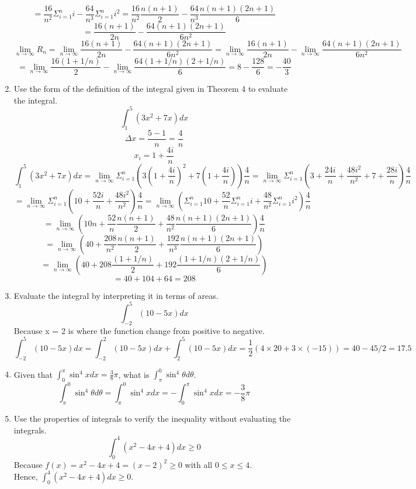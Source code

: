 \documentclass[12pt]{article}
\begin{document}
\begin{enumerate}
    \[ = \frac{16}{n^2} \Sigma_{i = 1}^{n}i - \frac{64}{n^3} \Sigma_{i = 1}^{n} i^2 = \frac{16}{n^2} \frac{n(n+1)}{2} - \frac{64}{n^3} \frac{n(n+1)(2n+1)}{6}\]
    \[ = \frac{16(n+1)}{2n} - \frac{64(n+1)(2n+1)}{6n^2}\]
    \[\lim_{n \to \infty} R_n = \lim_{n \to \infty} \frac{16(n+1)}{2n} - \frac{64(n+1)(2n+1)}{6n^2} = \lim_{n \to \infty} \frac{16(n+1)}{2n} - \lim_{n \to \infty} \frac{64(n+1)(2n+1)}{6n^2}\]
    \[ = \lim_{n \to \infty} \frac{16(1+1/n)}{2} - \lim_{n \to \infty} \frac{64(1+1/n)(2+1/n)}{6} = 8 - \frac{128}{6} = - \frac{40}{3}\]
\setcounter{enumi}{30}
    \item Use the form of the definition of the integral given in Theorem 4 to evaluate the integral.
    \[\int_{1}^{5} (3x^2+7x)dx\]
    \[\Delta x = \frac{5-1}{n} = \frac{4}{n}\]
    \[x_i = 1 + \frac{4i}{n}\]
    \[\int_{1}^{5} (3x^2+7x)dx = \lim_{n \to \infty} \Sigma_{i=1}^{n} (3(1+\frac{4i}{n})^2+7(1+\frac{4i}{n})) \frac{4}{n} = \lim_{n \to \infty} \Sigma_{i=1}^{n} (3 + \frac{24i}{n} + \frac{48i^2}{n^2}+7+\frac{28i}{n}) \frac{4}{n} \]
    \[ = \lim_{n \to \infty} \Sigma_{i=1}^{n} (10 + \frac{52i}{n} + \frac{48i^2}{n^2}) \frac{4}{n}  = \lim_{n \to \infty} (\Sigma_{i=1}^{n} 10 + \frac{52}{n} \Sigma_{i=1}^{n} i + \frac{48}{n^2}\Sigma_{i=1}^{n}i^2 ) \frac{4}{n}  \]
    \[ = \lim_{n \to \infty} (10n + \frac{52}{n} \frac{n(n+1)}{2} + \frac{48}{n^2} \frac{n(n+1)(2n+1)}{6})\frac{4}{n} \]
    \[ = \lim_{n \to \infty} (40 + \frac{208}{n^2} \frac{n(n+1)}{2} + \frac{192}{n^3} \frac{n(n+1)(2n+1)}{6})\]
    \[ = \lim_{n \to \infty} (40 + 208 \frac{(1+1/n)}{2} + 192 \frac{(1+1/n)(2+1/n)}{6})\]
    \[ = 40 + 104 + 64 = 208\]
\setcounter{enumi}{40}
    \item Evaluate the integral by interpreting it in terms of areas.
    \[\int_{-2}^{5} (10 - 5x) dx\]
    Because x = 2 is where the function change from positive to negative.
    \[\int_{-2}^{5} (10 - 5x) dx = \int_{-2}^{2} (10 - 5x) dx + \int_{2}^{5} (10 - 5x) dx = \frac{1}{2}(4 \times 20 + 3 \times (-15)) = 40 - 45/2 = 17.5\]
\setcounter{enumi}{51}
    \item Given that $\int_{0}^{\pi} \sin^4 x dx = \frac{3}{8}\pi$, what is $\int_{\pi}^{0} \sin^4 \theta d\theta$.
    \[\int_{\pi}^{0} \sin^4 \theta d\theta = \int_{\pi}^{0} \sin^4 x dx = - \int_{0}^{\pi} \sin^4 x dx = - \frac{3}{8}\pi\]
\setcounter{enumi}{64}
    \item Use the properties of integrals to verify the inequality without evaluating the integrals.
    \[\int_{0}^{4}(x^2-4x+4) dx \geq 0\]
    Because $f(x) = x^2 -4x + 4 = (x-2)^2 \geq 0$ with all $0 \leq x \leq 4$. \\ 
    Hence, $\int_{0}^{4}(x^2-4x+4) dx \geq 0$.  
\end{enumerate}
\end{document}
